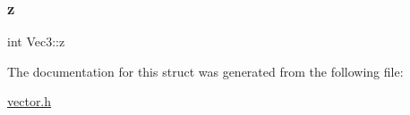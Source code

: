 \mbox{\label{structVec3_ae81b73bbda5bfa26b648a44158bf6d36}} 
\subsubsection{\texorpdfstring{z}{z}}
{\footnotesize\ttfamily int Vec3\+::z}



The documentation for this struct was generated from the following file\+:\begin{DoxyCompactItemize}
\item 
\hyperlink{vector_8h}{vector.\+h}\end{DoxyCompactItemize}

